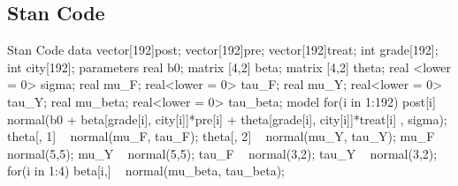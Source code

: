 \documentclass{article}
\begin{document}
\subsection{Stan Code}
\begin{sexylisting}{Stan Code}
data{
  vector[192]post;
  vector[192]pre;
  vector[192]treat;
  int grade[192];
  int city[192];
}
parameters{
  real b0;
  matrix [4,2] beta;
  matrix [4,2] theta;
  real <lower = 0> sigma;
  real mu_F;
  real<lower = 0> tau_F;
  real mu_Y;
  real<lower = 0> tau_Y;
  real mu_beta;
  real<lower = 0> tau_beta;
}
model{
  for(i in 1:192){
    post[i] ~ normal(b0 + beta[grade[i], city[i]]*pre[i] + 
                          theta[grade[i], city[i]]*treat[i] ,
                          sigma);
  }
  theta[, 1] ~ normal(mu_F, tau_F);
  theta[, 2] ~ normal(mu_Y, tau_Y);
  mu_F ~ normal(5,5);
  mu_Y ~ normal(5,5);
  tau_F ~ normal(3,2);
  tau_Y ~ normal(3,2);
  for(i in 1:4){
    beta[i,] ~ normal(mu_beta, tau_beta);
  }
}
\end{sexylisting}
\end{document}
